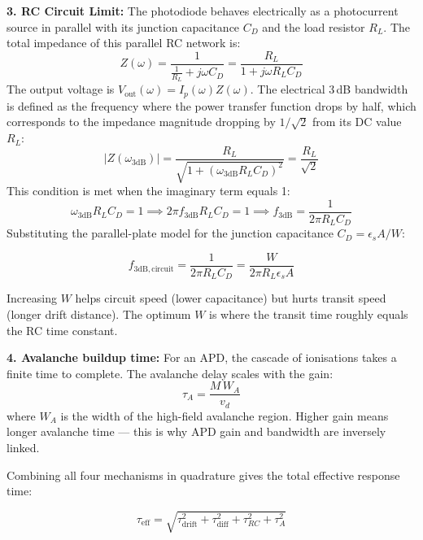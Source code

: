 \textbf{3. RC Circuit Limit:} The photodiode behaves electrically as a photocurrent source in parallel with its junction capacitance $C_D$ and the load resistor $R_L$. The total impedance of this parallel RC network is:
\begin{equation*}
    Z(\omega) = \frac{1}{\frac{1}{R_L} + j\omega C_D} = \frac{R_L}{1 + j\omega R_L C_D}
\end{equation*}
The output voltage is $V_\text{out}(\omega) = I_p(\omega) Z(\omega)$. The electrical 3\,dB bandwidth is defined as the frequency where the power transfer function drops by half, which corresponds to the impedance magnitude dropping by $1/\sqrt{2}$ from its DC value $R_L$:
\begin{equation*}
    |Z(\omega_{3\text{dB}})| = \frac{R_L}{\sqrt{1 + (\omega_{3\text{dB}} R_L C_D)^2}} = \frac{R_L}{\sqrt{2}}
\end{equation*}
This condition is met when the imaginary term equals 1:
\begin{equation*}
    \omega_{3\text{dB}} R_L C_D = 1 \implies 2\pi f_{3\text{dB}} R_L C_D = 1 \implies f_{3\text{dB}} = \frac{1}{2\pi R_L C_D}
\end{equation*}
Substituting the parallel-plate model for the junction capacitance $C_D = \epsilon_s A / W$:
\begin{keyresult}
    \begin{equation}
        f_{3\text{dB},\text{circuit}} = \frac{1}{2\pi R_L C_D} = \frac{W}{2\pi R_L \epsilon_s A}
    \end{equation}
\end{keyresult}
Increasing $W$ helps circuit speed (lower capacitance) but hurts transit speed (longer drift distance). The optimum $W$ is where the transit time roughly equals the RC time constant.

\textbf{4. Avalanche buildup time:} For an APD, the cascade of ionisations takes a finite time to complete. The avalanche delay scales with the gain:
\begin{equation*}
    \tau_A = \frac{M\,W_A}{v_d}
\end{equation*}
where $W_A$ is the width of the high-field avalanche region. Higher gain means longer avalanche time — this is why APD gain and bandwidth are inversely linked.

Combining all four mechanisms in quadrature gives the total effective response time:
\begin{keyresult}
    \begin{equation}
        \tau_\text{eff} = \sqrt{\tau_\text{drift}^2 + \tau_\text{diff}^2 + \tau_{RC}^2 + \tau_A^2}
    \end{equation}
\end{keyresult}

